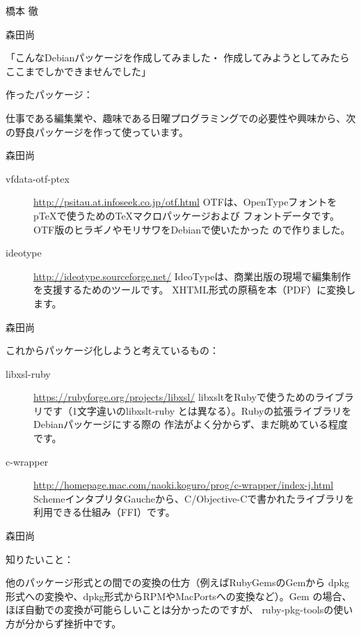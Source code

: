 \documentclass[cjk,dvipdfmx,12pt]{beamer}
\begin{document}
\begin{frame}{橋本 徹}
\end{frame}\begin{frame}{森田尚}

{「こんなDebianパッケージを作成してみました・
作成してみようとしてみたらここまでしかできませんでした」}

作ったパッケージ：

仕事である編集業や、趣味である日曜プログラミングでの必要性や興味から、次
の野良パッケージを作って使っています。

\end{frame}\begin{frame}{森田尚}

\begin{description}
 \item[vfdata-otf-ptex]
  \url{http://psitau.at.infoseek.co.jp/otf.html}
  OTFは、OpenTypeフォントをpTeXで使うためのTeXマクロパッケージおよび
  フォントデータです。OTF版のヒラギノやモリサワをDebianで使いたかった
  ので作りました。

 \item[ideotype]
  \url{http://ideotype.sourceforge.net/}
  IdeoTypeは、商業出版の現場で編集制作を支援するためのツールです。
  XHTML形式の原稿を本（PDF）に変換します。
\end{description}

\end{frame}\begin{frame}{森田尚}

これからパッケージ化しようと考えているもの：

\begin{description}
\item[libxsl-ruby]
	   \url{https://rubyforge.org/projects/libxsl/}
  libxsltをRubyで使うためのライブラリです（1文字違いのlibxslt-ruby
  とは異なる）。Rubyの拡張ライブラリをDebianパッケージにする際の
  作法がよく分からず、まだ眺めている程度です。

\item[c-wrapper]
	   \url{http://homepage.mac.com/naoki.koguro/prog/c-wrapper/index-j.html}
  SchemeインタプリタGaucheから、C/Objective-Cで書かれたライブラリを
  利用できる仕組み（FFI）です。
\end{description}

\end{frame}\begin{frame}{森田尚}

知りたいこと：

  他のパッケージ形式との間での変換の仕方（例えばRubyGemsのGemから
  dpkg形式への変換や、dpkg形式からRPMやMacPortsへの変換など）。Gem
  の場合、ほぼ自動での変換が可能らしいことは分かったのですが、
  ruby-pkg-toolsの使い方が分からず挫折中です。


\end{frame}
\end{document}
